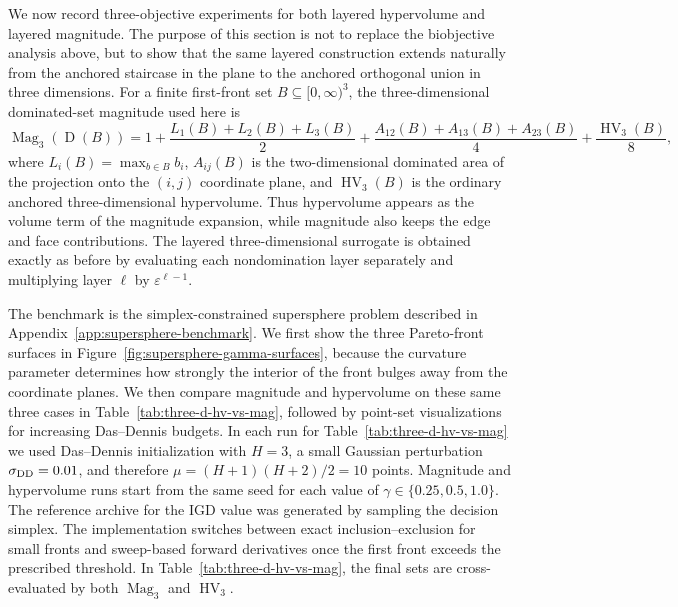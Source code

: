 \documentclass{article}
\newcommand{\Mag}{\operatorname{Mag}}
\newcommand{\HV}{\operatorname{HV}}
\newcommand{\Dom}{\operatorname{D}}
\begin{document}
We now record three-objective experiments for both layered hypervolume and layered magnitude.  The purpose of this section is not to replace the biobjective analysis above, but to show that the same layered construction extends naturally from the anchored staircase in the plane to the anchored orthogonal union in three dimensions.  For a finite first-front set $B\subseteq [0,\infty)^3$, the three-dimensional dominated-set magnitude used here is
\[
\Mag_3(\Dom(B))
=1+\frac{L_1(B)+L_2(B)+L_3(B)}{2}
 +\frac{A_{12}(B)+A_{13}(B)+A_{23}(B)}{4}
 +\frac{\HV_3(B)}{8},
\]
where $L_i(B)=\max_{b\in B} b_i$, $A_{ij}(B)$ is the two-dimensional dominated area of the projection onto the $(i,j)$ coordinate plane, and $\HV_3(B)$ is the ordinary anchored three-dimensional hypervolume.  Thus hypervolume appears as the volume term of the magnitude expansion, while magnitude also keeps the edge and face contributions.  The layered three-dimensional surrogate is obtained exactly as before by evaluating each nondomination layer separately and multiplying layer $\ell$ by $\varepsilon^{\ell-1}$.

The benchmark is the simplex-constrained supersphere problem described in Appendix~\ref{app:supersphere-benchmark}.  We first show the three Pareto-front surfaces in Figure~\ref{fig:supersphere-gamma-surfaces}, because the curvature parameter determines how strongly the interior of the front bulges away from the coordinate planes.  We then compare magnitude and hypervolume on these same three cases in Table~\ref{tab:three-d-hv-vs-mag}, followed by point-set visualizations for increasing Das--Dennis budgets.  In each run for Table~\ref{tab:three-d-hv-vs-mag} we used Das--Dennis initialization with $H=3$, a small Gaussian perturbation $\sigma_{\rm DD}=0.01$, and therefore $\mu=(H+1)(H+2)/2=10$ points.  Magnitude and hypervolume runs start from the same seed for each value of $\gamma\in\{0.25,0.5,1.0\}$.  The reference archive for the IGD value was generated by sampling the decision simplex.  The implementation switches between exact inclusion--exclusion for small fronts and sweep-based forward derivatives once the first front exceeds the prescribed threshold.  In Table~\ref{tab:three-d-hv-vs-mag}, the final sets are cross-evaluated by both $\Mag_3$ and $\HV_3$.

\newcommand{\superspheresurface}[2]{%
\begin{tikzpicture}
\begin{axis}[
  width=0.31\linewidth,
  view={135}{27},
  xlabel={$F_1$}, ylabel={$F_2$}, zlabel={$F_3$},
  xmin=0,xmax=1,ymin=0,ymax=1,zmin=0,zmax=1,
  xtick={0,1},ytick={0,1},ztick={0,1},
  title={#2},
  title style={font=\small},
  tick label style={font=\scriptsize},
  label style={font=\scriptsize},
]
\addplot3[
  surf,
  shader=flat,
  samples=15,
  samples y=15,
  domain=0:1,
  y domain=0:1,
  draw=blue!35,
  fill opacity=0.45,
] ({1-((((x-1)^2+((1-x)*y)^2+((1-x)*(1-y))^2)/2)^(#1))},
   {1-(((x^2+(((1-x)*y)-1)^2+((1-x)*(1-y))^2)/2)^(#1))},
   {1-(((x^2+((1-x)*y)^2+(((1-x)*(1-y))-1)^2)/2)^(#1))});
\end{axis}
\end{tikzpicture}%
}
\end{document}
